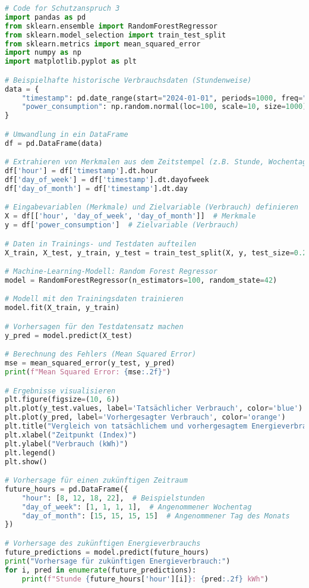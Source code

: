 {}
\begin{lstlisting}[language=python,caption=Code für Schutzanspruch 3, label=lst:schutz3]
# Code for Schutzanspruch 3
import pandas as pd
from sklearn.ensemble import RandomForestRegressor
from sklearn.model_selection import train_test_split
from sklearn.metrics import mean_squared_error
import numpy as np
import matplotlib.pyplot as plt

# Beispielhafte historische Verbrauchsdaten (Stundenweise)
data = {
    "timestamp": pd.date_range(start="2024-01-01", periods=1000, freq="H"),
    "power_consumption": np.random.normal(loc=100, scale=10, size=1000)  # Verbrauchsdaten simuliert
}

# Umwandlung in ein DataFrame
df = pd.DataFrame(data)

# Extrahieren von Merkmalen aus dem Zeitstempel (z.B. Stunde, Wochentag, Tag)
df['hour'] = df['timestamp'].dt.hour
df['day_of_week'] = df['timestamp'].dt.dayofweek
df['day_of_month'] = df['timestamp'].dt.day

# Eingabevariablen (Merkmale) und Zielvariable (Verbrauch) definieren
X = df[['hour', 'day_of_week', 'day_of_month']]  # Merkmale
y = df['power_consumption']  # Zielvariable (Verbrauch)

# Daten in Trainings- und Testdaten aufteilen
X_train, X_test, y_train, y_test = train_test_split(X, y, test_size=0.2, random_state=42)

# Machine-Learning-Modell: Random Forest Regressor
model = RandomForestRegressor(n_estimators=100, random_state=42)

# Modell mit den Trainingsdaten trainieren
model.fit(X_train, y_train)

# Vorhersagen für den Testdatensatz machen
y_pred = model.predict(X_test)

# Berechnung des Fehlers (Mean Squared Error)
mse = mean_squared_error(y_test, y_pred)
print(f"Mean Squared Error: {mse:.2f}")

# Ergebnisse visualisieren
plt.figure(figsize=(10, 6))
plt.plot(y_test.values, label='Tatsächlicher Verbrauch', color='blue')
plt.plot(y_pred, label='Vorhergesagter Verbrauch', color='orange')
plt.title("Vergleich von tatsächlichem und vorhergesagtem Energieverbrauch")
plt.xlabel("Zeitpunkt (Index)")
plt.ylabel("Verbrauch (kWh)")
plt.legend()
plt.show()

# Vorhersage für einen zukünftigen Zeitraum
future_hours = pd.DataFrame({
    "hour": [8, 12, 18, 22],  # Beispielstunden
    "day_of_week": [1, 1, 1, 1],  # Angenommener Wochentag
    "day_of_month": [15, 15, 15, 15]  # Angenommener Tag des Monats
})

# Vorhersage des zukünftigen Energieverbrauchs
future_predictions = model.predict(future_hours)
print("Vorhersage für zukünftigen Energieverbrauch:")
for i, pred in enumerate(future_predictions):
    print(f"Stunde {future_hours['hour'][i]}: {pred:.2f} kWh")
    
\end{lstlisting}




